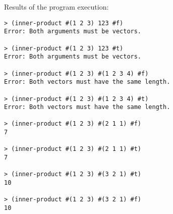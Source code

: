 \documentclass{article}
\begin{document}
	Results of the program execution:
	
\begin{verbatim} 
> (inner-product #(1 2 3) 123 #f)
Error: Both arguments must be vectors.

> (inner-product #(1 2 3) 123 #t)
Error: Both arguments must be vectors.

> (inner-product #(1 2 3) #(1 2 3 4) #f)
Error: Both vectors must have the same length.

> (inner-product #(1 2 3) #(1 2 3 4) #t)
Error: Both vectors must have the same length.

> (inner-product #(1 2 3) #(2 1 1) #f)
7

> (inner-product #(1 2 3) #(2 1 1) #t)
7

> (inner-product #(1 2 3) #(3 2 1) #t)
10

> (inner-product #(1 2 3) #(3 2 1) #f)
10
\end{verbatim}

\paragraph{}\
\paragraph{}\
\paragraph{}\
\paragraph{}\
\paragraph{}\
\paragraph{}\
\paragraph{}\
\paragraph{}\
\paragraph{}\
\paragraph{}\
\end{document}
